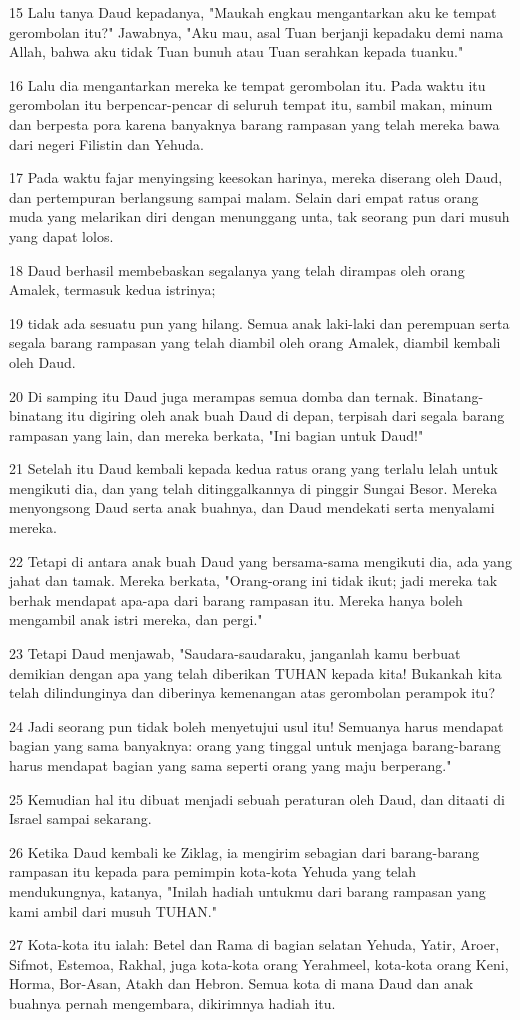 \par 15 Lalu tanya Daud kepadanya, "Maukah engkau mengantarkan aku ke tempat gerombolan itu?" Jawabnya, "Aku mau, asal Tuan berjanji kepadaku demi nama Allah, bahwa aku tidak Tuan bunuh atau Tuan serahkan kepada tuanku."
\par 16 Lalu dia mengantarkan mereka ke tempat gerombolan itu. Pada waktu itu gerombolan itu berpencar-pencar di seluruh tempat itu, sambil makan, minum dan berpesta pora karena banyaknya barang rampasan yang telah mereka bawa dari negeri Filistin dan Yehuda.
\par 17 Pada waktu fajar menyingsing keesokan harinya, mereka diserang oleh Daud, dan pertempuran berlangsung sampai malam. Selain dari empat ratus orang muda yang melarikan diri dengan menunggang unta, tak seorang pun dari musuh yang dapat lolos.
\par 18 Daud berhasil membebaskan segalanya yang telah dirampas oleh orang Amalek, termasuk kedua istrinya;
\par 19 tidak ada sesuatu pun yang hilang. Semua anak laki-laki dan perempuan serta segala barang rampasan yang telah diambil oleh orang Amalek, diambil kembali oleh Daud.
\par 20 Di samping itu Daud juga merampas semua domba dan ternak. Binatang-binatang itu digiring oleh anak buah Daud di depan, terpisah dari segala barang rampasan yang lain, dan mereka berkata, "Ini bagian untuk Daud!"
\par 21 Setelah itu Daud kembali kepada kedua ratus orang yang terlalu lelah untuk mengikuti dia, dan yang telah ditinggalkannya di pinggir Sungai Besor. Mereka menyongsong Daud serta anak buahnya, dan Daud mendekati serta menyalami mereka.
\par 22 Tetapi di antara anak buah Daud yang bersama-sama mengikuti dia, ada yang jahat dan tamak. Mereka berkata, "Orang-orang ini tidak ikut; jadi mereka tak berhak mendapat apa-apa dari barang rampasan itu. Mereka hanya boleh mengambil anak istri mereka, dan pergi."
\par 23 Tetapi Daud menjawab, "Saudara-saudaraku, janganlah kamu berbuat demikian dengan apa yang telah diberikan TUHAN kepada kita! Bukankah kita telah dilindunginya dan diberinya kemenangan atas gerombolan perampok itu?
\par 24 Jadi seorang pun tidak boleh menyetujui usul itu! Semuanya harus mendapat bagian yang sama banyaknya: orang yang tinggal untuk menjaga barang-barang harus mendapat bagian yang sama seperti orang yang maju berperang."
\par 25 Kemudian hal itu dibuat menjadi sebuah peraturan oleh Daud, dan ditaati di Israel sampai sekarang.
\par 26 Ketika Daud kembali ke Ziklag, ia mengirim sebagian dari barang-barang rampasan itu kepada para pemimpin kota-kota Yehuda yang telah mendukungnya, katanya, "Inilah hadiah untukmu dari barang rampasan yang kami ambil dari musuh TUHAN."
\par 27 Kota-kota itu ialah: Betel dan Rama di bagian selatan Yehuda, Yatir, Aroer, Sifmot, Estemoa, Rakhal, juga kota-kota orang Yerahmeel, kota-kota orang Keni, Horma, Bor-Asan, Atakh dan Hebron. Semua kota di mana Daud dan anak buahnya pernah mengembara, dikirimnya hadiah itu.

